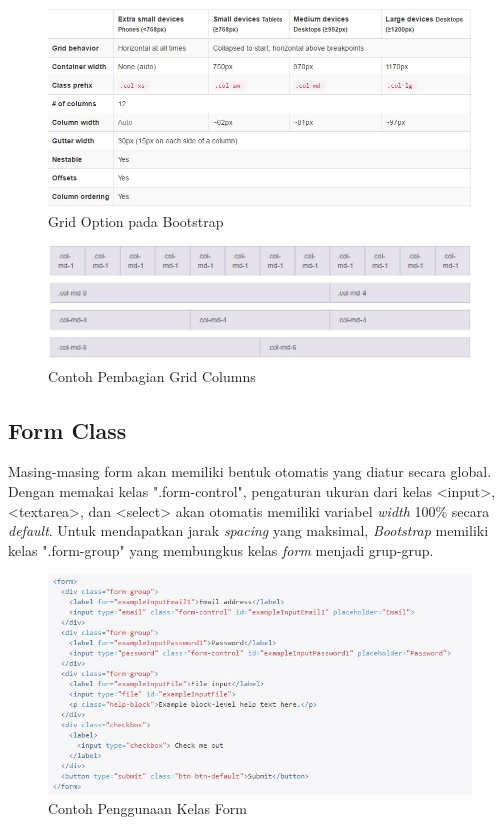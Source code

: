 \begin{figure}[H]
	\centering
	\includegraphics[scale=0.75]{Gambar/gridOption}
	\caption{Grid Option pada Bootstrap}
	\label{fig:gridOpt}
\end{figure}

\begin{figure}[H]
	\centering
	\includegraphics[scale=0.75]{Gambar/kolom}
	\caption{Contoh Pembagian Grid Columns}
	\label{fig:gridCol}
\end{figure}

\subsection{Form Class}
\label{sub: formClass}
	Masing-masing form akan memiliki bentuk otomatis yang diatur secara global. Dengan memakai kelas ".form-control", pengaturan ukuran dari kelas <input>, <textarea>, dan <select> akan otomatis memiliki variabel \textit{width} 100\% secara \textit{default}. Untuk mendapatkan jarak \textit{spacing} yang maksimal, \textit{Bootstrap} memiliki kelas ".form-group" yang membungkus kelas \textit{form} menjadi grup-grup.
	
\begin{figure}[H]
	\centering
	\includegraphics[scale=0.75]{Gambar/formCode}
	\caption{Contoh Penggunaan Kelas Form}
	\label{fig:formCode}
\end{figure}

